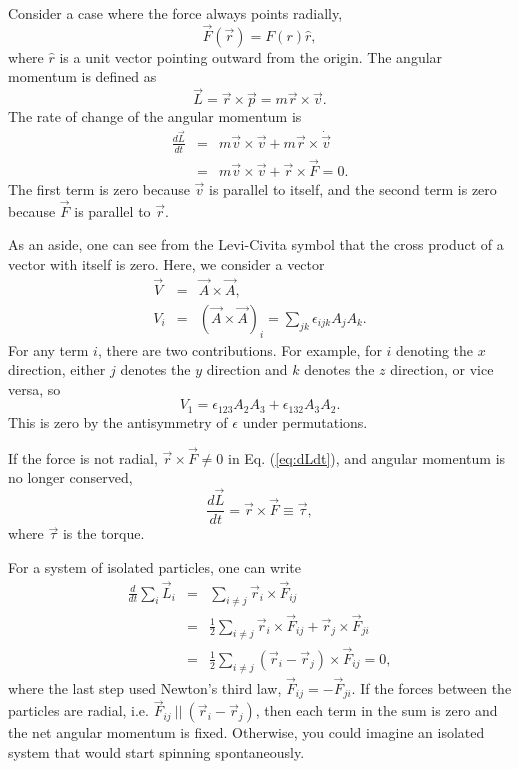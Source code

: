 Consider a case where the force always points radially,
\begin{equation}
\vec{F}(\vec{r})=F(r)\hat{r},
\end{equation}
where $\hat{r}$ is a unit vector pointing outward from the origin. The angular momentum is defined as
\begin{equation}
\vec{L}=\vec{r}\times\vec{p}=m\vec{r}\times\vec{v}.
\end{equation}
The rate of change of the angular momentum is
\begin{eqnarray}
\label{eq:dLdt}
\frac{d\vec{L}}{dt}&=&m\vec{v}\times\vec{v}+m\vec{r}\times\dot{\vec{v}}\\
\nonumber
&=&m\vec{v}\times\vec{v}+\vec{r}\times{\vec{F}}=0.
\end{eqnarray}
The first term is zero because $\vec{v}$ is parallel to itself, and the second term is zero because $\vec{F}$ is parallel to $\vec{r}$.

As an aside, one can see from the Levi-Civita symbol that the cross product of a vector with itself is zero. Here, we consider a vector
\begin{eqnarray}
\vec{V}&=&\vec{A}\times\vec{A},\\
\nonumber
V_i&=&(\vec{A}\times\vec{A})_i=\sum_{jk}\epsilon_{ijk}A_jA_k.
\end{eqnarray}
For any term $i$, there are two contributions. For example, for $i$ denoting the $x$ direction, either $j$ denotes the $y$ direction and $k$ denotes the $z$ direction, or vice versa, so
\begin{equation}
V_1=\epsilon_{123}A_2A_3+\epsilon_{132}A_3A_2.
\end{equation}
This is zero by the antisymmetry of $\epsilon$ under permutations.

If the force is not radial, $\vec{r}\times\vec{F}\ne 0$ in Eq. (\ref{eq:dLdt}), and angular momentum is no longer conserved,
\begin{equation}
\frac{d\vec{L}}{dt}=\vec{r}\times\vec{F}\equiv\vec{\tau},
\end{equation}
where $\vec{\tau}$ is the torque.

For a system of isolated particles, one can write
\begin{eqnarray}
\frac{d}{dt}\sum_i\vec{L}_i&=&\sum_{i\ne j}\vec{r}_i\times \vec{F}_{ij}\\
\nonumber
&=&\frac{1}{2}\sum_{i\ne j} \vec{r}_i\times \vec{F}_{ij}+\vec{r}_j\times\vec{F}_{ji}\\
\nonumber
&=&\frac{1}{2}\sum_{i\ne j} (\vec{r}_i-\vec{r}_j)\times\vec{F}_{ij}=0,
\end{eqnarray}
where the last step used Newton's third law, $\vec{F}_{ij}=-\vec{F}_{ji}$. If the forces between the particles are radial, i.e. $\vec{F}_{ij} ~||~ (\vec{r}_i-\vec{r}_j)$, then each term in the sum is zero and the net angular momentum is fixed. Otherwise, you could imagine an isolated system that would start spinning spontaneously. 

